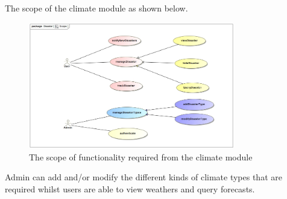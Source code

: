 The scope of the climate module as shown below.

\begin{figure}[ht!]
\centering
\includegraphics[width=90mm]{../images/Scope.jpg}
\caption{The scope of functionality required from the climate module \label{overflow}}
\end{figure}

Admin can add and/or modify the different kinds of climate types that are required whilst users are able to view weathers and query forecasts.